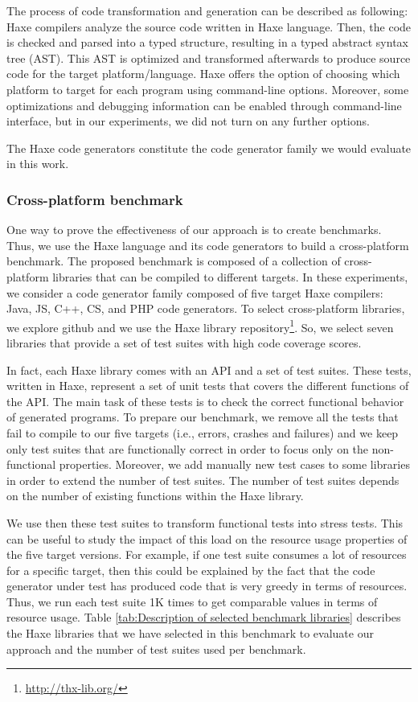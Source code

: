 The process of code transformation and generation can be described as following: Haxe compilers analyze the source code written in Haxe language. Then, the code is checked and parsed into a typed structure, resulting in a typed abstract syntax tree (AST). This AST is optimized and transformed afterwards to produce source code for the target platform/language.
Haxe offers the option of choosing which platform to target for each program using command-line options. Moreover, some optimizations and debugging information can be enabled through command-line interface, but in our experiments, we did not turn on any further options. 

The Haxe code generators constitute the code generator family we would evaluate in this work.

\subsubsection{Cross-platform benchmark}
One way to prove the effectiveness of our approach is to create benchmarks. Thus, we use the Haxe language and its code generators to build a cross-platform benchmark. The proposed benchmark is composed of a collection of cross-platform libraries that can be compiled to different targets. In these experiments, we consider a code generator family composed of five target Haxe compilers: Java, JS, C++, CS, and PHP code generators. To select cross-platform libraries, we explore github and we use the Haxe library repository\footnote{\url{http://thx-lib.org/}}. So, we select seven libraries that provide a set of test suites with high code coverage scores. 

In fact, each Haxe library comes with an API and a set of test suites. These tests, written in Haxe, represent a set of unit tests that covers the different functions of the API. The main task of these tests is to check the correct functional behavior of generated programs. To prepare our benchmark, we remove all the tests that fail to compile to our five targets (i.e., errors, crashes and failures) and we keep only test suites that are functionally correct in order to focus only on the non-functional properties.
Moreover, we add manually new test cases to some libraries in order to extend the number of test suites. The number of test suites depends on the number of existing functions within the Haxe library.

We use then these test suites to transform functional tests into stress tests. This can be useful to study the impact of this load on the resource usage properties of the five target versions. For example, if one test suite consumes a lot of resources for a specific target, then this could be explained by the fact that the code generator under test has produced code that is very greedy in terms of resources.
Thus, we run each test suite 1K times to get comparable values in terms of resource usage.
Table \ref{tab:Description of selected benchmark libraries} describes the Haxe libraries that we have selected in this benchmark to evaluate our
approach and the number of test suites used per benchmark.

